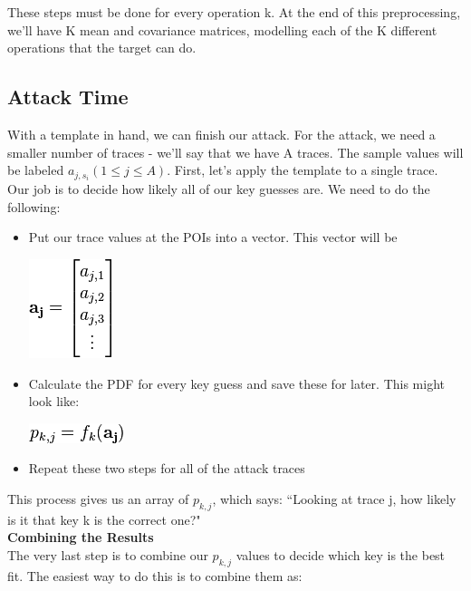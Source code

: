 \begin{itemize}
    \end{itemize}
    
    These steps must be done for every operation k. At the end of this
    preprocessing, we'll have K mean and covariance matrices, modelling each of
    the K different operations that the target can do.

    \subsection{Attack Time}
    With a template in hand, we can finish our attack. For the attack, we need a
    smaller number of traces - we'll say that we have A traces. The sample
    values will be labeled $a_{j, s_i} (1 \le j \le A)$. First, let's apply the
    template to a single trace. Our job is to decide how likely all of our key
    guesses are. We need to do the following:
    \begin{itemize}
      \item Put our trace values at the POIs into a vector. This vector will be
       \begin{minipage}{\linewidth}
      \centering
      \includegraphics{images/Lecture_5/pic6.png}
      \end{minipage}
       
      \item Calculate the PDF for every key guess and save these for later. This
      might look like:
      \begin{minipage}{\linewidth}
      \centering
      \includegraphics{images/Lecture_5/pic7.png}
      \end{minipage}
      \item Repeat these two steps for all of the attack traces
    \end{itemize}
    This process gives us an array of $p_{k, j}$, which says: ``Looking at trace
    j, how likely is it that key k is the correct one?"\\
    \textbf{Combining the Results}\\
    The very last step is to combine our $p_{k, j}$ values to decide which key
    is the best fit. The easiest way to do this is to combine them as:
    
